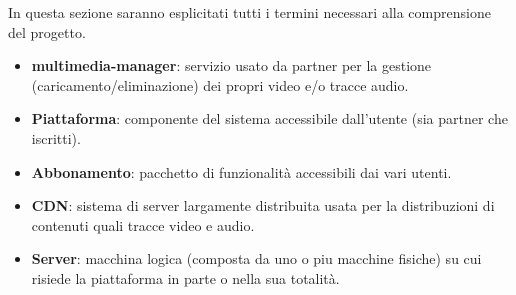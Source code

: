  In questa sezione saranno esplicitati tutti i termini necessari alla comprensione del progetto.

\begin{itemize}
	\item  \textbf{multimedia-manager}: servizio usato da partner per la gestione (caricamento/eliminazione) dei propri video e/o tracce audio.
	
	\item \textbf{Piattaforma}: componente del sistema accessibile dall'utente (sia partner che iscritti).
	\item \textbf{Abbonamento}: pacchetto di funzionalità accessibili dai vari utenti.
	\item \textbf{CDN}: sistema di server largamente distribuita usata per la distribuzioni di contenuti quali tracce video e audio.
	\item \textbf{Server}: macchina logica (composta da uno o piu macchine fisiche) su cui risiede la piattaforma in parte o nella sua totalità.
\end{itemize}